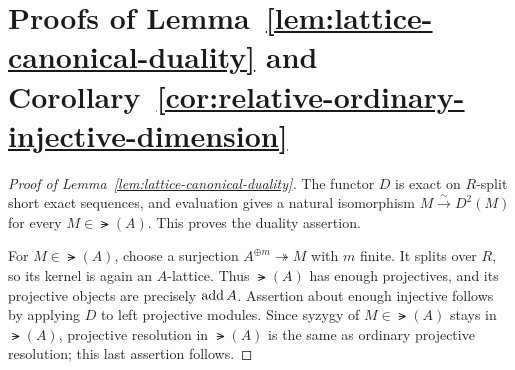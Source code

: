 \documentclass[a4paper,leqno]{amsart}
\begin{document}
\section{Proofs of Lemma~\ref{lem:lattice-canonical-duality} and Corollary~\ref{cor:relative-ordinary-injective-dimension}}
\label{app:lattice-proofs}
\begin{proof}[Proof of Lemma~\ref{lem:lattice-canonical-duality}]
The functor $D$ is exact on $R$-split short exact sequences, and evaluation gives a natural isomorphism $M\xrightarrow{\sim}D^2(M)$ for every $M\in\lat(A)$. This proves the duality assertion.

For $M\in\lat(A)$, choose a surjection $A^{\oplus m}\twoheadrightarrow M$ with $m$ finite. It splits over $R$, so its kernel is again an $A$-lattice. Thus $\lat(A)$ has enough projectives, and its projective objects are precisely $\operatorname{add} A$. Assertion about enough injective follows by applying $D$ to left projective modules.  Since syzygy of $M\in \lat(A)$ stays in $\lat(A)$, projective resolution in $\lat(A)$ is the same as ordinary projective resolution; this last assertion follows.
\end{proof}
\end{document}
